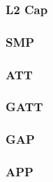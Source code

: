 \subsubsection{L2 Cap}
\subsubsection{SMP}
\subsubsection{ATT}
\subsubsection{GATT}
\subsubsection{GAP}
\subsubsection{APP}

